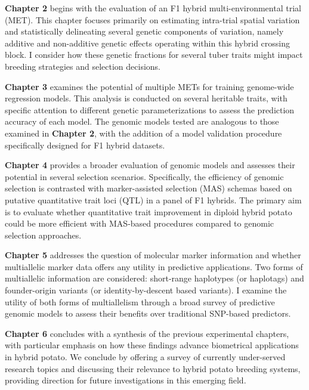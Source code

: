 \documentclass[
]{article}
\begin{document}
\textbf{Chapter 2} begins with the evaluation of an F1 hybrid
multi-environmental trial (MET). This chapter focuses primarily on
estimating intra-trial spatial variation and statistically delineating
several genetic components of variation, namely additive and
non-additive genetic effects operating within this hybrid crossing
block. I consider how these genetic fractions for several tuber traits
might impact breeding strategies and selection decisions.

\textbf{Chapter 3} examines the potential of multiple METs for training
genome-wide regression models. This analysis is conducted on several
heritable traits, with specific attention to different genetic
parameterizations to assess the prediction accuracy of each model. The
genomic models tested are analogous to those examined in \textbf{Chapter
2}, with the addition of a model validation procedure specifically
designed for F1 hybrid datasets.

\textbf{Chapter 4} provides a broader evaluation of genomic models and
assesses their potential in several selection scenarios. Specifically,
the efficiency of genomic selection is contrasted with marker-assisted
selection (MAS) schemas based on putative quantitative trait loci (QTL)
in a panel of F1 hybrids. The primary aim is to evaluate whether
quantitative trait improvement in diploid hybrid potato could be more
efficient with MAS-based procedures compared to genomic selection
approaches.

\textbf{Chapter 5} addresses the question of molecular marker
information and whether multiallelic marker data offers any utility in
predictive applications. Two forms of multiallelic information are
considered: short-range haplotypes (or haplotags) and founder-origin
variants (or identity-by-descent based variants). I examine the utility
of both forms of multiallelism through a broad survey of predictive
genomic models to assess their benefits over traditional SNP-based
predictors.

\textbf{Chapter 6} concludes with a synthesis of the previous
experimental chapters, with particular emphasis on how these findings
advance biometrical applications in hybrid potato. We conclude by
offering a survey of currently under-served research topics and
discussing their relevance to hybrid potato breeding systems, providing
direction for future investigations in this emerging field.


\printbibliography[title=References]
\end{document}
